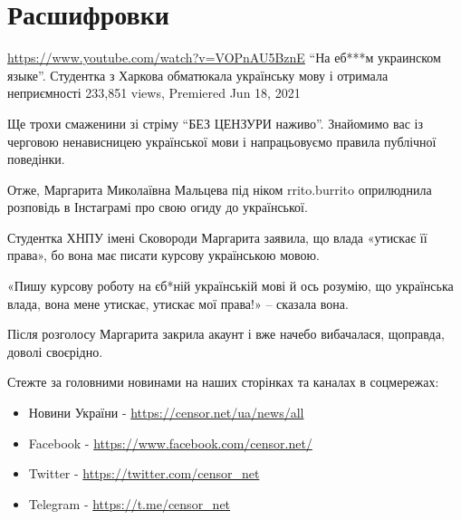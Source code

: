  
 
 
 
 
\part{Расшифровки}

\url{https://www.youtube.com/watch?v=VOPnAU5BznE}
\enquote{На еб***м украинском языке}. Студентка з Харкова обматюкала українську мову і отримала неприємності
233,851 views, Premiered Jun 18, 2021

Ще трохи смаженини зі стріму \enquote{БЕЗ ЦЕНЗУРИ наживо}. Знайомимо вас із
черговою ненависницею української мови і напрацьовуємо правила публічної
поведінки.

Отже, Маргарита Миколаївна Мальцева під ніком rrito.burrito оприлюднила розповідь в Інстаграмі про свою огиду до української.

Студентка ХНПУ імені Сковороди Маргарита заявила, що влада «утискає її права»,
бо вона має писати курсову українською мовою.

«Пишу курсову роботу на єб*ній українській мові й ось розумію, що українська
влада, вона мене утискає, утискає мої права!» – сказала вона.

Після розголосу Маргарита закрила акаунт і вже начебо вибачалася, щоправда, доволі своєрідно.

Стежте за головними новинами на наших сторінках та каналах в соцмережах:
\begin{itemize}
  \item Новини України - \url{https://censor.net/ua/news/all}   
  \item Facebook - \url{https://www.facebook.com/censor.net/}   
  \item Twitter - \url{https://twitter.com/censor_net}   
  \item Telegram - \url{https://t.me/censor_net}
\end{itemize}


